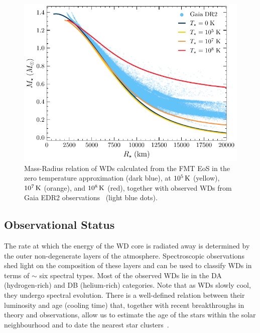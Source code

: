 \begin{figure}[!ht]
    \centering
    \includegraphics{WD_mass_radius.pdf}
    \caption{Mass-Radius relation of WDs calculated from the FMT EoS in the zero temperature approximation (dark blue), at $10^{5}{\rm \,K}$ (yellow), $10^{7}{\rm \,K}$ (orange), and $10^{8}{\rm \,K}$ (red), together with observed WDs from Gaia EDR2 observations~\cite{GentileFusillo_feb_GaiaDataRelease} (light blue dots).}
    \label{fig:WD_mass_radius}
\end{figure}


\subsection{Observational Status}

The rate at which the energy of the WD core is radiated away is determined by the outer non-degenerate layers of the atmosphere. 
Spectroscopic observations shed light on the composition of these layers and can be used to classify WDs in terms of $\sim$ six spectral types. 
Most of the observed WDs lie in the DA (hydrogen-rich) and DB (helium-rich) categories.  Note that as WDs slowly cool, they undergo spectral evolution. There is a well-defined relation between their luminosity and age (cooling time) that, together with recent breakthroughs in theory and observations, allow us to estimate the age of the stars within the solar neighbourhood and to date the nearest star clusters~\cite{Hansen:2004ih_HSTobservationswhite,Hansen:2007ve_Whitedwarfcooling,Bedin:2009it_jun_Endwhitedwarf,Hansen:2013gda_aug_Agedifferencetwo,Kilic_mar_Agesthindisk}. 

